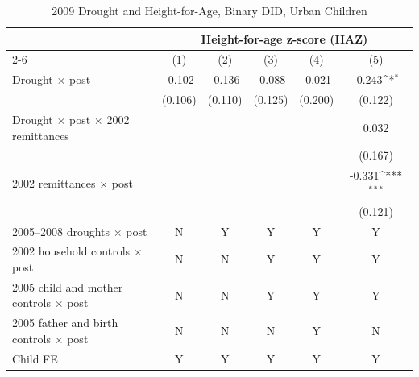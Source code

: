 \documentclass[12pt]{article}
\def\sym#1{\ifmmode^{#1}\else\(^{#1}\)\fi}
\begin{document}
\begin{longtable}{l*{5}{c}}
\caption{2009 Drought and Height-for-Age, Binary DID, Urban Children}\\
\toprule
 & \multicolumn{5}{c}{Height-for-age z-score (HAZ)}\\
\cmidrule(lr){2-6}
            &\multicolumn{1}{c}{(1)}         &\multicolumn{1}{c}{(2)}         &\multicolumn{1}{c}{(3)}         &\multicolumn{1}{c}{(4)}         &\multicolumn{1}{c}{(5)}         \\
\midrule
Drought \ensuremath{\times} post&      -0.102         &      -0.136         &      -0.088         &      -0.021         &      -0.243\sym{*}  \\
            &     (0.106)         &     (0.110)         &     (0.125)         &     (0.200)         &     (0.122)         \\
Drought \ensuremath{\times} post \ensuremath{\times} 2002 remittances&                     &                     &                     &                     &       0.032         \\
            &                     &                     &                     &                     &     (0.167)         \\
2002 remittances \ensuremath{\times} post&                     &                     &                     &                     &      -0.331\sym{***}\\
            &                     &                     &                     &                     &     (0.121)         \\
\midrule
2005--2008 droughts \ensuremath{\times} post&           N         &           Y         &           Y         &           Y         &           Y         \\
2002 household controls \ensuremath{\times} post&           N         &           N         &           Y         &           Y         &           Y         \\
2005 child and mother controls \ensuremath{\times} post&           N         &           N         &           Y         &           Y         &           Y         \\
2005 father and birth controls \ensuremath{\times} post&           N         &           N         &           N         &           Y         &           N         \\
Child FE    &           Y         &           Y         &           Y         &           Y         &           Y         \\

\end{longtable}
\end{document}
